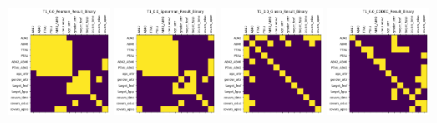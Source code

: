 \begin{figure}
    \includegraphics[width=0.24\textwidth]{chap6/figs/T1_0.0_Pearson_Result_Binary.png}
    \includegraphics[width=0.24\textwidth]{chap6/figs/T1_0.0_Spearman_Result_Binary.png}
    \includegraphics[width=0.24\textwidth]{chap6/figs/T1_0.0_Glasso_Result_Binary.png}
    \includegraphics[width=0.24\textwidth]{chap6/figs/T1_0.0_CODEC_Result_Binary.png}
    

\end{figure}
